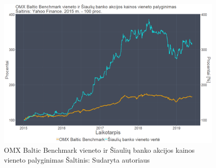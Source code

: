 \documentclass[12pt]{article}
\begin{document}
\begin{figure}[H]
\captionsetup{justification=centering}
\center
\includegraphics[scale=0.4]{SAB.png}
\caption{OMX Baltic Benchmark vieneto ir Šiaulių banko akcijos kainos vieneto palyginimas \newline
Šaltinis: Sudaryta autoriaus}
\end{figure}
\end{document}
